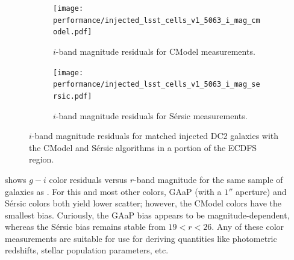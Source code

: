 \begin{figure}[hbt!]
  \centering
  \begin{subfigure}[t]{0.45\textwidth}
  \texttt{[image: performance/injected\_lsst\_cells\_v1\_5063\_i\_mag\_cmodel.pdf]}
  \caption{$i$-band magnitude residuals for CModel measurements.}
  \end{subfigure}\hfill
  \begin{subfigure}[t]{0.45\textwidth}
  \texttt{[image: performance/injected\_lsst\_cells\_v1\_5063\_i\_mag\_sersic.pdf]}
  \caption{$i$-band magnitude residuals for S\'ersic measurements.}
  \end{subfigure}\hfill
\caption{$i$-band magnitude residuals for matched injected DC2 galaxies with the CModel and S\'ersic algorithms in a portion of the \gls{ECDFS} region.}
\label{fig:injected_lsst_cells_v1_5063_i_mag}
\vspace{0.1cm}
\end{figure}
 shows $g-i$ color residuals versus $r$-band magnitude for the same sample of galaxies as .
For this and most other colors, \gls{GAaP} (with a $1''$ aperture) and S\'ersic colors both yield lower scatter; however, the CModel colors have the smallest bias.
Curiously, the \gls{GAaP} bias appears to be magnitude-dependent, whereas the S\'ersic bias remains stable from $19<r<26$.
Any of these color measurements are suitable for use for deriving quantities like photometric redshifts, stellar population parameters, etc.

